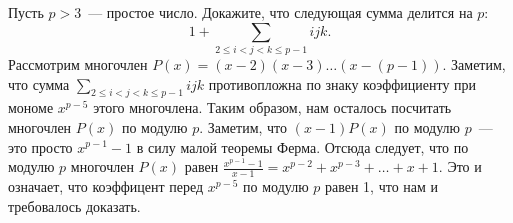 \problem{}
Пусть $p > 3$~--- простое число.
Докажите, что следующая сумма делится на $p$:
\[
    1 +
    \sum_{2 \leq i < j < k \leq p-1}
        i j k
.\]
\solution
Рассмотрим многочлен $P(x) = (x - 2) (x - 3) \ldots (x - (p - 1))$.
Заметим, что сумма
\(
    \sum_{2 \leq i < j < k \leq p-1}
        i j k
\)
противопложна по знаку коэффициенту при мономе $x^{p-5}$ этого многочлена.
Таким образом, нам осталось посчитать многочлен $P(x)$ по модулю $p$.
Заметим, что $(x - 1) P(x)$ по модулю $p$~--- это просто $x^{p-1} - 1$ в силу малой
теоремы Ферма.
Отсюда следует, что по модулю $p$ многочлен $P(x)$ равен
$\frac{x^{p-1} - 1}{x - 1} = x^{p-2} + x^{p-3} + \ldots + x + 1$.
Это и означает, что коэффицент перед $x^{p-5}$ по модулю $p$ равен 1, что нам и
требовалось доказать.
\endproblem
